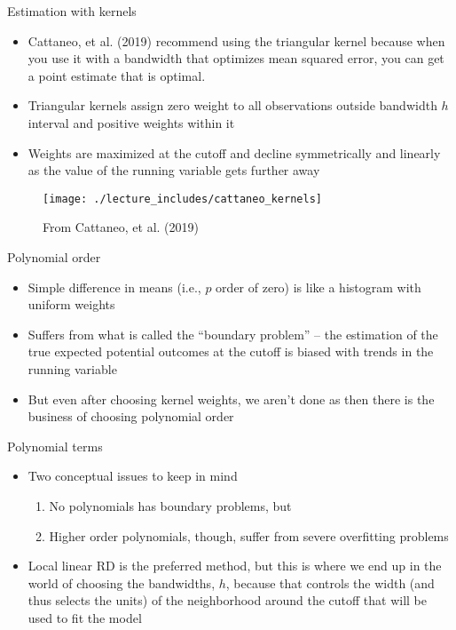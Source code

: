 \documentclass{beamer}
\begin{document}
\begin{frame}{Estimation with kernels}


\begin{itemize}
\item Cattaneo, et al. (2019) recommend using the triangular kernel because when you use it with a bandwidth that optimizes mean squared error, you can get a point estimate that is optimal. 
\item Triangular kernels assign zero weight to all observations outside bandwidth $h$ interval and positive weights within it
\item Weights are maximized at the cutoff and decline symmetrically and linearly as the value of the running variable gets further away
\end{itemize}

\end{frame}

\begin{frame}

		\begin{figure}
		\texttt{[image: ./lecture\_includes/cattaneo\_kernels]}
		\caption{From Cattaneo, et al. (2019)}
		\end{figure}

\end{frame}

\begin{frame}{Polynomial order}

\begin{itemize}
\item Simple difference in means (i.e., $p$ order of zero) is like a histogram with uniform weights
\item Suffers from what is called the ``boundary problem'' -- the estimation of the true expected potential outcomes at the cutoff is biased with trends in the running variable
\item But even after choosing kernel weights, we aren't done as then there is the business of choosing polynomial order
\end{itemize}

\end{frame}



\begin{frame}{Polynomial terms}

\begin{itemize}
\item Two conceptual issues to keep in mind
	\begin{enumerate}
	\item No polynomials has boundary problems, but
	\item Higher order polynomials, though, suffer from severe overfitting problems
	\end{enumerate}
\item Local linear RD is the preferred method, but this is where we end up in the world of choosing the bandwidths, $h$, because that controls the width (and thus selects the units) of the neighborhood around the cutoff that will be used to fit the model
\end{itemize}

\end{frame}
\end{document}
